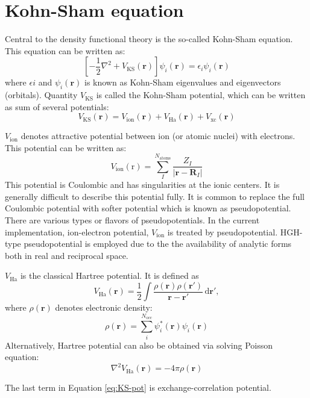 \section{Kohn-Sham equation}

Central to the density functional theory is the so-called Kohn-Sham
equation.
This equation can be written as:
\begin{equation}
\left[
-\frac{1}{2}\nabla^2  + V_{\mathrm{KS}}(\mathbf{r})
\right] \psi_{i}(\mathbf{r}) =
\epsilon_{i}\psi_{i}(\mathbf{r})
\end{equation}
where $\epsilon{i}$ and $\psi_{i}(\mathbf{r})$ is known as Kohn-Sham
eigenvalues and eigenvectors (orbitals).
Quantity $V_{\mathrm{KS}}$ is called the Kohn-Sham potential, which can be
written as sum of several potentials:
\begin{equation}
V_{\mathrm{KS}}(\mathbf{r}) = V_{\mathrm{ion}}(\mathbf{r}) + V_{\mathrm{Ha}}(\mathbf{r})
+ V_{\mathrm{xc}}(\mathbf{r})
\label{eq:KS-pot}
\end{equation}

$V_{\mathrm{ion}}$ denotes attractive potential between ion (or atomic nuclei)
with electrons. This potential can be written as:
\begin{equation}
V_{\mathrm{ion}}(\mathrm{r}) =
\sum_{I}^{N_{\mathrm{atoms}}}
\frac{Z_{I}}{ \left| \mathbf{r} - \mathbf{R}_{I} \right| }
\end{equation}
This potential is Coulombic and has singularities
at the ionic centers. It is generally difficult to describe this
potential fully. It is common to replace the full Coulombic potential
with softer potential which is known as pseudopotential.
There are various types or flavors of pseudopotentials.
In the current implementation, ion-electron potential, $V_{\mathrm{ion}}$
is treated by pseudopotential. HGH-type pseudopotential is employed due to the
the availability of analytic forms both in real and reciprocal space.

$V_{\mathrm{Ha}}$ is the classical Hartree potential. It is defined as
\begin{equation}
V_{\mathrm{Ha}}(\mathbf{r}) = \frac{1}{2} \int
\frac{ \rho(\mathbf{r}) \rho(\mathbf{r}')}
{\mathbf{r} - \mathbf{r}'}\,\mathrm{d}\mathbf{r}',
\end{equation}
where $\rho(\mathbf{r})$ denotes electronic density:
\begin{equation}
\rho(\mathbf{r}) = \sum_{i}^{N_{\mathrm{occ}}}
\psi^{*}_{i}(\mathbf{r}) \psi_{i}(\mathbf{r})
\end{equation}
Alternatively, Hartree potential can also be obtained via solving Poisson equation:
\begin{equation}
\nabla^{2} V_{\mathrm{Ha}}(\mathbf{r}) = -4\pi \rho(\mathbf{r})
\end{equation}

The last term in Equation \eqref{eq:KS-pot} is exchange-correlation potential.

